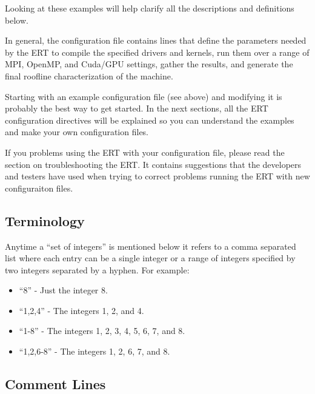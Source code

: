 Looking at these examples will help clarify all the descriptions and
definitions below.

In general, the configuration file contains lines that define the parameters
needed by the ERT to compile the specified drivers and kernels, run them over a
range of MPI, OpenMP, and Cuda/GPU settings, gather the results, and generate
the final roofline characterization of the machine.

Starting with an example configuration file (see above) and modifying it is
probably the best way to get started.  In the next sections, all the ERT
configuration directives will be explained so you can understand the examples
and make your own configuration files.

If you problems using the ERT with your configuration file, please read the
section on troubleshooting the ERT.  It contains suggestions that the
developers and testers have used when trying to correct problems running
the ERT with new configuraiton files.

\subsection{Terminology}

Anytime a ``set of integers'' is mentioned below it refers to a comma
separated list where each entry can be a single integer or a range of
integers specified by two integers separated by a hyphen.  For example:

\begin{itemize}

\vspace{-0.1in}
\item{``8'' - Just the integer 8.}

\vspace{-0.1in}
\item{``1,2,4'' - The integers 1, 2, and 4.}

\vspace{-0.1in}
\item{``1-8'' - The integers 1, 2, 3, 4, 5, 6, 7, and 8.}

\vspace{-0.1in}
\item{``1,2,6-8'' - The integers 1, 2, 6, 7, and 8.}

\end{itemize}

\subsection{Comment Lines}

